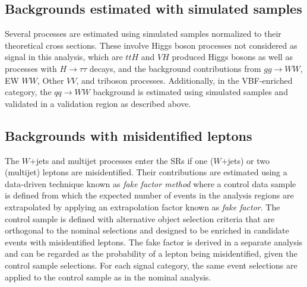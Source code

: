 \subsection{Backgrounds estimated with simulated samples}
Several processes are estimated using simulated samples normalized to their theoretical cross sections. These involve Higgs boson processes not considered as signal in this analysis, which are $ttH$ and $VH$ produced Higgs bosons as well as processes with $H\to\tau\tau$ decays, and the background contributions from $gg \to WW$, EW $WW$, Other $VV$, and triboson processes. Additionally, in the VBF-enriched \TwoJet category, the $qq \to WW$ background is estimated using simulated samples and validated in a validation region as described above.



\subsection{Backgrounds with misidentified leptons}
\label{subsec:misid-bkg}
The $W$+jets and multijet processes enter the SRs if one ($W$+jets) or two (multijet) leptons are misidentified.
Their contributions are estimated using a data-driven technique known as \emph{fake factor method} where a control data sample is defined from which the expected number of events in the analysis regions are extrapolated by applying an extrapolation factor known as \emph{fake factor}.
The control sample is defined with alternative object selection criteria that are orthogonal to the nominal selections and designed to be enriched in candidate events with misidentified leptons.
The fake factor is derived in a separate analysis and can be regarded as the probability of a lepton being misidentified, given the control sample selections.
For each signal category, the same event selections are applied to the control sample as in the nominal analysis.

